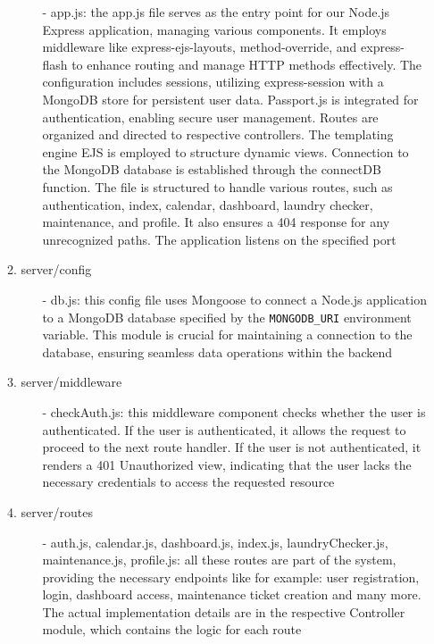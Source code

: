 \documentclass[conference]{IEEEtran}
\begin{document}
\begin{enumerate}
\begin{enumerate}
\begin{itemize}
                    \item[-] app.js: the app.js file serves as the entry point for our Node.js Express application, managing various components. It employs middleware like express-ejs-layouts, method-override, and express-flash to enhance routing and manage HTTP methods effectively. The configuration includes sessions, utilizing express-session with a MongoDB store for persistent user data. Passport.js is integrated for authentication, enabling secure user management. Routes are organized and directed to respective controllers. The templating engine EJS is employed to structure dynamic views. Connection to the MongoDB database is established through the connectDB function. The file is structured to handle various routes, such as authentication, index, calendar, dashboard, laundry checker, maintenance, and profile. It also ensures a 404 response for any unrecognized paths. The application listens on the specified port
                \end{itemize}
            \item server/config
                \begin{itemize}
                    \item[-] db.js: this config file uses Mongoose to connect a Node.js application to a MongoDB database specified by the \texttt{MONGODB\_URI} environment variable. This module is crucial for maintaining a connection to the database, ensuring seamless data operations within the backend
                \end{itemize}
            \item server/middleware
                \begin{itemize}
                    \item[-] checkAuth.js: this middleware component checks whether the user is authenticated. If the user is authenticated, it allows the request to proceed to the next route handler. If the user is not authenticated, it renders a 401 Unauthorized view, indicating that the user lacks the necessary credentials to access the requested resource
                \end{itemize}
            \item server/routes
                \begin{itemize}
                    \item[-] auth.js, calendar.js, dashboard.js, index.js, laundryChecker.js, maintenance.js, profile.js: all these routes are part of the system, providing the necessary endpoints like for example: user registration, login, dashboard access, maintenance ticket creation and many more. The actual implementation details are in the respective Controller module, which contains the logic for each route

\end{itemize}
\end{enumerate}
\end{enumerate}
\end{document}
